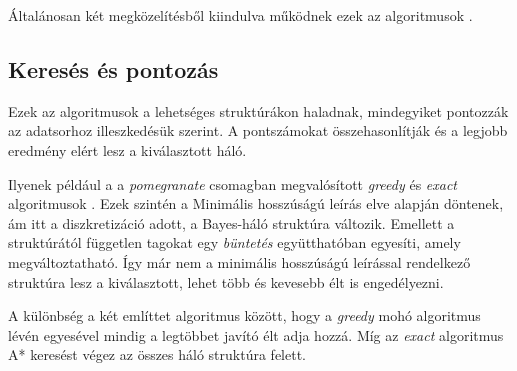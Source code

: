 Általánosan két megközelítésből kiindulva működnek ezek az algoritmusok \cite{tsamardinos2006max}.

\subsection{Keresés és pontozás}
Ezek az algoritmusok a lehetséges struktúrákon haladnak, mindegyiket pontozzák az adatsorhoz illeszkedésük szerint. A pontszámokat összehasonlítják és a legjobb eredmény elért lesz a kiválasztott háló.

Ilyenek például a a \emph{pomegranate} csomagban megvalósított \emph{greedy} és \emph{exact} algoritmusok \cite{schreiber2018pomegranate}. Ezek szintén a Minimális hosszúságú leírás elve alapján döntenek, ám itt a diszkretizáció adott, a Bayes-háló struktúra változik. Emellett a struktúrától független tagokat egy \emph{büntetés} együtthatóban egyesíti, amely megváltoztatható. Így már nem a minimális hosszúságú leírással rendelkező struktúra lesz a kiválasztott, lehet több és kevesebb élt is engedélyezni.

A különbség a két említtet algoritmus között, hogy a \emph{greedy} mohó algoritmus lévén egyesével mindig a legtöbbet javító élt adja hozzá. Míg az \emph{exact} algoritmus A* keresést végez az összes háló struktúra felett.


